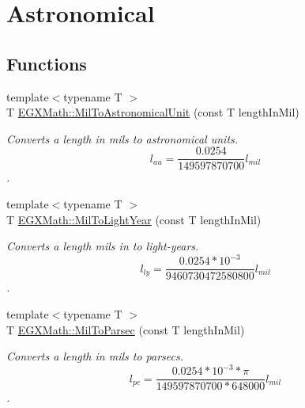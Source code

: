 \hypertarget{group___e_g_x_math-_conversions-_length_conversions-_imperial-_mil-_astronomical}{}\section{Astronomical}
\label{group___e_g_x_math-_conversions-_length_conversions-_imperial-_mil-_astronomical}
\subsection*{Functions}
\begin{DoxyCompactItemize}
\item 
{\footnotesize template$<$typename T $>$ }\\T \mbox{\hyperlink{group___e_g_x_math-_conversions-_length_conversions-_imperial-_mil-_astronomical_gaa7f4d37736c3265b5eb5ee9a16d91914}{E\+G\+X\+Math\+::\+Mil\+To\+Astronomical\+Unit}} (const T length\+In\+Mil)
\begin{DoxyCompactList}\small\item\em Converts a length in mils to astronomical units. \[ l_{au}=\frac{0.0254}{149597870700} l_{mil} \]. \end{DoxyCompactList}\item 
{\footnotesize template$<$typename T $>$ }\\T \mbox{\hyperlink{group___e_g_x_math-_conversions-_length_conversions-_imperial-_mil-_astronomical_ga5f6040b0b1a9aca71dbdfe79fc257b35}{E\+G\+X\+Math\+::\+Mil\+To\+Light\+Year}} (const T length\+In\+Mil)
\begin{DoxyCompactList}\small\item\em Converts a length mils in to light-\/years. \[ l_{ly}=\frac{0.0254 * 10^{-3}}{9460730472580800} l_{mil} \]. \end{DoxyCompactList}\item 
{\footnotesize template$<$typename T $>$ }\\T \mbox{\hyperlink{group___e_g_x_math-_conversions-_length_conversions-_imperial-_mil-_astronomical_gac188be8dcd6efe85bf8d39fe1f98c622}{E\+G\+X\+Math\+::\+Mil\+To\+Parsec}} (const T length\+In\+Mil)
\begin{DoxyCompactList}\small\item\em Converts a length in mils to parsecs. \[ l_{pc}=\frac{0.0254 * 10^{-3} * \pi}{149597870700 * 648000} l_{mil} \]. \end{DoxyCompactList}\end{DoxyCompactItemize}


